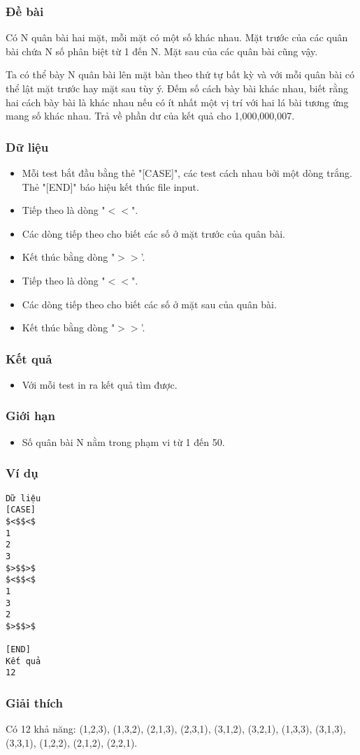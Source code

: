 



\subsubsection{   Đề bài  }

   Có N quân bài hai mặt, mỗi mặt có một số khác nhau. Mặt trước của các quân bài chứa N số phân biệt từ 1 đến N. Mặt sau của các quân bài cũng vậy.  

   Ta có thể bày N quân bài lên mặt bàn theo thứ tự bất kỳ và với mỗi quân bài có thể lật mặt trước hay mặt sau tùy ý. Đếm số cách bày bài khác nhau, biết rằng hai cách bày bài là khác nhau nếu có ít nhất một vị trí với hai lá bài tương ứng mang số khác nhau. Trả về phần dư của kết quả cho 1,000,000,007.  

\subsubsection{   Dữ liệu  }
\begin{itemize}
	\item     Mỗi test bắt đầu bằng thẻ "[CASE]", các test cách nhau bởi một dòng trắng. Thẻ "[END]" báo hiệu kết thúc file input.   
	\item     Tiếp theo là dòng "$<$$<$".   
	\item     Các dòng tiếp theo cho biết các số ở mặt trước của quân bài.   
	\item     Kết thúc bằng dòng "$>$$>$'.   
	\item     Tiếp theo là dòng "$<$$<$".   
	\item     Các dòng tiếp theo cho biết các số ở mặt sau của quân bài.   
	\item     Kết thúc bằng dòng "$>$$>$'.   
\end{itemize}

\subsubsection{   Kết quả  }
\begin{itemize}
	\item     Với mỗi test in ra kết quả tìm được.   
\end{itemize}

\subsubsection{   Giới hạn  }
\begin{itemize}
	\item     Số quân bài N nằm trong phạm vi từ 1 đến 50.   
\end{itemize}

\subsubsection{   Ví dụ  }
\begin{verbatim}
Dữ liệu
[CASE]
$<$$<$
1
2 
3
$>$$>$
$<$$<$
1 
3
2
$>$$>$

[END]
Kết quả
12
\end{verbatim}

\subsubsection{   Giải thích  }

   Có 12 khả năng: (1,2,3), (1,3,2), (2,1,3), (2,3,1), (3,1,2), (3,2,1), (1,3,3), (3,1,3), (3,3,1), (1,2,2), (2,1,2), (2,2,1).  